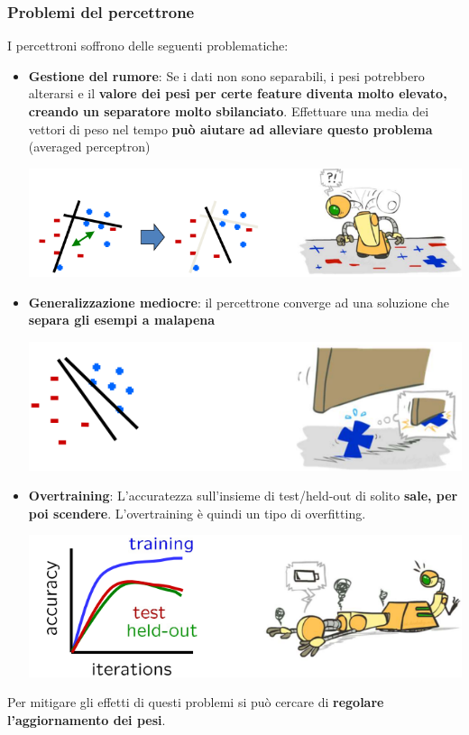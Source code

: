 \documentclass[12pt]{article}
\begin{document}
\subsubsection{Problemi del percettrone}
I percettroni soffrono delle seguenti problematiche:
\begin{itemize}
    \item \textbf{Gestione del rumore}: Se i dati non sono separabili, i pesi potrebbero alterarsi e il \textbf{valore dei pesi per certe feature diventa molto elevato, creando un separatore molto sbilanciato}.
    Effettuare una media dei vettori di peso nel tempo \textbf{può aiutare ad alleviare questo problema} (averaged perceptron)
    \begin{center}
        \includegraphics[width =0.60\linewidth]{Images/99.PNG}
    \end{center}
    \item \textbf{Generalizzazione mediocre}: il percettrone converge ad una soluzione che \textbf{separa gli esempi a malapena}
    \begin{center}
        \includegraphics[width =0.60\linewidth]{Images/100.PNG}
    \end{center}
    \item \textbf{Overtraining}: L'accuratezza sull'insieme di test/held-out di solito \textbf{sale, per poi scendere}.
    L'overtraining è quindi un tipo di overfitting.
    \begin{center}
        \includegraphics[width =0.60\linewidth]{Images/101.PNG}
    \end{center}
\end{itemize}
Per mitigare gli effetti di questi problemi si può cercare di \textbf{regolare l'aggiornamento dei pesi}.
\end{document}
